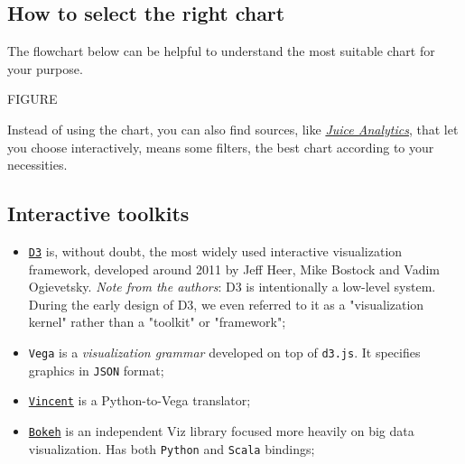 \subsection*{How to select the right chart}

The flowchart below can be helpful to understand the most suitable chart for your purpose.

FIGURE

Instead of using the chart, you can also find sources, like \href{http://www.juiceanalytics.com}{\emph{Juice Analytics}}, that let you choose interactively, means some filters, the best chart according to your necessities.

\subsection{Interactive toolkits}

\begin{itemize}
\item \href{https://d3js.org}{\texttt{D3}} is, without doubt, the most widely used interactive visualization framework, developed around 2011 by Jeff Heer, Mike Bostock and Vadim Ogievetsky. \emph{Note from the authors}: D3 is intentionally a low-level system. During the early design of D3, we even referred to it as a "visualization kernel" rather than a "toolkit" or "framework";

\item \texttt{Vega} is a \emph{visualization grammar} developed on top of \texttt{d3.js}. It specifies graphics in \texttt{JSON} format;

\item \href{https://vega.github.io/vega/}{\texttt{Vincent}} is a Python-to-Vega translator;

\item \href{http://bokeh.pydata.org/en/latest/}{\texttt{Bokeh}} is an independent Viz library focused more heavily on big data visualization. Has both \texttt{Python} and \texttt{Scala} bindings; 

\end{itemize}

